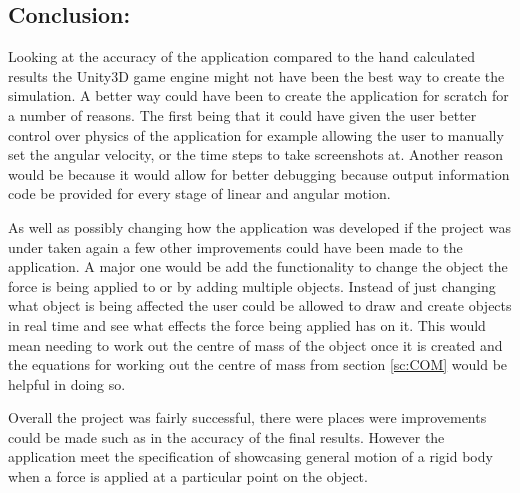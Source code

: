 \subsection{Conclusion:}\label{sc:Con}
Looking at the accuracy of the application compared to the hand calculated results the Unity3D game engine might not have been the best way to create the simulation.
A better way could have been to create the application for scratch for a number of reasons.
The first being that it could have given the user better control over physics of the application for example allowing the user to manually set the angular velocity, or the time steps to take screenshots at.
Another reason would be because it would allow for better debugging because output information code be provided for every stage of linear and angular motion.

As well as possibly changing how the application was developed if the project was under taken again a few other improvements could have been made to the application.
A major one would be add the functionality to change the object the force is being applied to or by adding multiple objects.
Instead of just changing what object is being affected the user could be allowed to draw and create objects in real time and see what effects the force being applied has on it.
This would mean needing to work out the centre of mass of the object once it is created and the equations for working out the centre of mass from section \ref{sc:COM} would be helpful in doing so. 

Overall the project was fairly successful, there were places were improvements could be made such as in the accuracy of the final results.
However the application meet the specification of showcasing general motion of a rigid body when a force is applied at a particular point on the object. 
